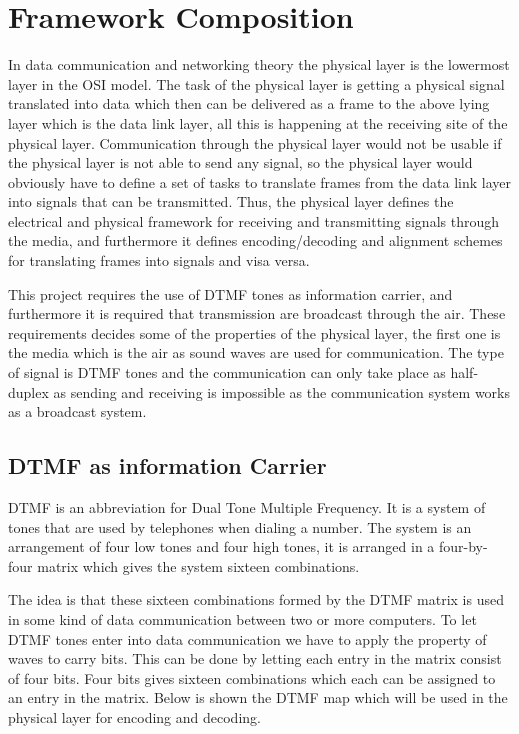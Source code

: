\section{Framework Composition}\label{sec:physical_analysis} 
In data communication and networking theory the physical layer is the lowermost
layer in the OSI model\cite{KOM}. The task of the physical layer is getting a physical signal 
translated into data which then can be delivered as a frame to the above lying layer 
which is the data link layer, all this is happening at the receiving site of the physical
layer. Communication through the physical layer would not be usable if the physical layer 
is not able to send any signal, so the physical layer would obviously have to define a set 
of tasks to translate frames from the data link layer into signals that can be transmitted. 
Thus, the physical layer defines the electrical and physical framework for receiving and 
transmitting signals through the media, and furthermore it defines encoding/decoding 
and alignment schemes for translating frames into signals and visa versa.

This project requires the use of DTMF tones as information carrier, and furthermore it is
required that transmission are broadcast through the air. These requirements decides some
of the properties of the physical layer, the first one is the media which is the air as 
sound waves are used for communication. The type of signal is DTMF tones and the communication can
only take place as half-duplex as sending and receiving is impossible as the communication system works
as a broadcast system.


	\subsection{DTMF as information Carrier}
	DTMF is an abbreviation for Dual Tone Multiple Frequency. It is a system of tones that are used by
	telephones when dialing a number. The system is an arrangement of four low tones and four high tones,
	it is arranged in a four-by-four matrix which gives the system sixteen combinations.
	
	The idea is that these sixteen combinations formed by the DTMF matrix is used in some kind of data
	communication between two or more computers. To let DTMF tones enter into data communication we have
	to apply the property of  waves to carry bits. This can be done by letting each entry in the matrix
	consist of four bits. Four bits gives sixteen combinations which each can be assigned to an entry in
	the matrix. Below is shown the DTMF map which will be used in the physical layer for encoding and decoding.
	
